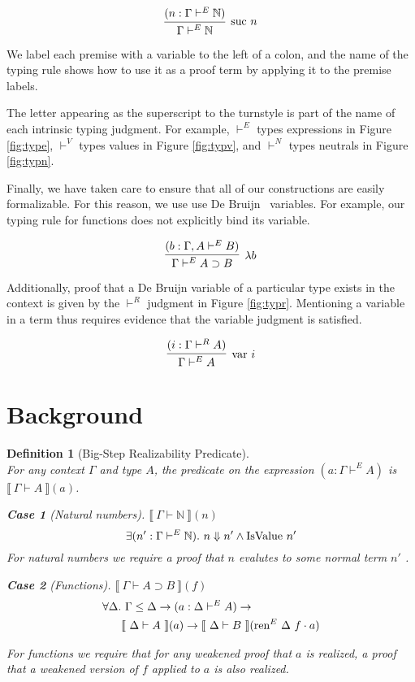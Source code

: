\documentclass[preprint,nonatbib]{sigplanconf}
\newtheorem{mydfn}{Definition}
\newtheorem{mysubdfn}{Case}
\numberwithin{mysubdfn}{mydfn}
\newcommand{\reffig}[1]{Figure \ref{fig:#1}}
\def\bigstep{\Downarrow}
\def\arr{\supset}
\def\marr{\rightarrow}
\def\app{\cdot}
\def\lam{\lambda}
\def\nat{\mathbb{N}}
\newcommand{\el}[1]{\llbracket ~ #1 ~ \rrbracket}
\newcommand{\con}[1]{\textmd{#1}}
\newcommand{\fun}[1]{\textmd{#1}}
\newcommand{\typm}[1]{\el{\Gamma \vdash #1}}
\newcommand{\dtypm}[1]{\el{\Delta \vdash #1}}
\newcommand{\type}[1]{\Gamma \vdash^E #1}
\newcommand{\dtype}[1]{\Delta \vdash^E #1}
\newcommand{\ctype}[2]{\Gamma , #1 \vdash^E #2}
\newcommand{\typr}[1]{\Gamma \vdash^R #1}
\newcommand{\ren}[1]{\Gamma \le #1}
\def\dren{\ren{\Delta}}
\begin{document}
$$
\infer
  [\con{suc} ~ n]
  {\type{\nat}}
{
  (n : \type{\nat})
}
$$

We label each premise with a variable to
the left of a colon, and the name of the typing rule shows how to use
it as a proof term by applying it to the premise labels.

The letter appearing as the superscript to the turnstyle is part of
the name of each intrinsic typing judgment. For example, $\vdash^E$
types expressions in \reffig{type}, $\vdash^V$ types values in
\reffig{typv}, and $\vdash^N$ types neutrals in \reffig{typn}.

Finally, we have taken care to ensure that all of our constructions
are easily formalizable. For this reason, we
use use De Bruijn~\cite{TODO} variables. For example, our typing rule
for functions does not explicitly bind its variable.

$$
\infer
  [\lam b]
  {\type{A \arr B}}
{
  (b : \ctype{A}{B})
}
$$

Additionally, proof that a De Bruijn variable of a particular type
exists in the context is given by the $\vdash^R$ judgment in
\reffig{typr}. Mentioning a variable in a term thus requires evidence
that the variable judgment is satisfied.

$$
\infer
  [\fun{var} ~ i]
  {\type{A}}
{
  (i : \typr{A})
}
$$

\section{Background}
\label{sec:background}


\begin{mydfn}[Big-Step Realizability Predicate]
$ $\\
For any context $\Gamma$ and type $A$, the predicate on the expression
$(a : \type{A})$ is $\typm{A}(a)$.

\begin{mysubdfn}[Natural numbers]
$\typm{\nat}(n)$
$$
\exists (n' : \type{\nat}).~ n \bigstep n' \wedge \fun{IsValue} ~ n'
$$
For natural numbers we require a proof that $n$ evalutes to
some normal term $n'$ .
\end{mysubdfn}


\begin{mysubdfn}[Functions]
$\typm{A \arr B}(f)$
\begin{align*}
\forall \Delta.&~ \dren \marr (a : \dtype{A}) \marr \\
&\dtypm{A}(a) \marr \dtypm{B}(\fun{ren}^E ~ \Delta ~ f \app a)
\end{align*}



For functions we require that for any weakened proof that $a$
is realized, a proof that a weakened version of $f$ applied to
$a$ is also realized.
\end{mysubdfn}

\end{mydfn}
\end{document}
